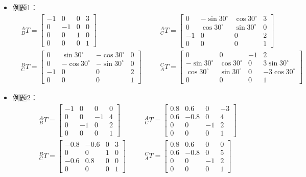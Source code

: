 \documentclass[
12pt, %
a4paper, 
oneside, %
]{scrartcl}
\begin{document}
\begin{itemize}
\item 例题1：
\begin{align*}
&{}^A_B T = \begin{bmatrix} -1 & 0 & 0 & 3 \\ 0 & -1 & 0 & 0 \\ 0 & 0 & 1 & 0 \\ 0 & 0 & 0 & 1 \end{bmatrix} \quad &
&{}^A_C T = \begin{bmatrix} 0 & -\sin 30^\circ & \cos 30^\circ & 3 \\ 0 & \cos 30^\circ & \sin 30^\circ & 0 \\ -1 & 0 & 0 & 2 \\ 0 & 0 & 0 & 1 \end{bmatrix} \\
&{}^B_C T = \begin{bmatrix} 0 & \sin 30^\circ & -\cos 30^\circ & 0 \\ 0 & -\cos 30^\circ & -\sin 30^\circ & 0 \\ -1 & 0 & 0 & 2 \\ 0 & 0 & 0 & 1 \end{bmatrix} \quad &
&{}^C_A T = \begin{bmatrix} 0 & 0 & -1 & 2 \\ -\sin 30^\circ & \cos 30^\circ & 0 & 3\sin 30^\circ \\ \cos 30^\circ & \sin 30^\circ & 0 & -3\cos 30^\circ \\ 0 & 0 & 0 & 1 \end{bmatrix}
\end{align*}
\item 例题2：
\begin{align*}
&{}^A_B T = \begin{bmatrix} -1 & 0 & 0 & 0 \\ 0 & 0 & -1 & 4 \\ 0 & -1 & 0 & 2 \\ 0 & 0 & 0 & 1 \end{bmatrix} \quad &
&{}^A_C T = \begin{bmatrix} 0.8 & 0.6 & 0 & -3 \\ 0.6 & -0.8 & 0 & 4 \\ 0 & 0 & -1 & 2 \\ 0 & 0 & 0 & 1 \end{bmatrix} \\
&{}^B_C T = \begin{bmatrix} -0.8 & -0.6 & 0 & 3 \\ 0 & 0 & 1 & 0 \\ -0.6 & 0.8 & 0 & 0 \\ 0 & 0 & 0 & 1 \end{bmatrix} \quad &
&{}^C_A T = \begin{bmatrix} 0.8 & 0.6 & 0 & 0 \\ 0.6 & -0.8 & 0 & 5 \\ 0 & 0 & -1 & 2 \\ 0 & 0 & 0 & 1 \end{bmatrix}
\end{align*}
\end{itemize}
\end{document}
